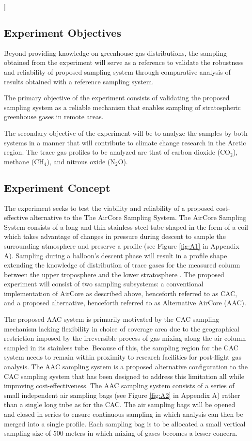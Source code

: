 ]\documentclass[a4paper,12pt,twoside]{article}
\begin{document}
\subsection{Experiment Objectives}

Beyond providing knowledge on greenhouse gas distributions, the sampling obtained from the experiment will serve as a reference to validate the robustness and reliability of proposed sampling system through comparative analysis of results obtained with a reference sampling system.

The primary objective of the experiment consists of validating the proposed sampling system as a reliable mechanism that enables sampling of stratospheric greenhouse gases in remote areas.

The secondary objective of the experiment will be to analyze the samples by both systems in a manner that will contribute to climate change research in the Arctic region. The trace gas profiles to be analyzed are that of carbon dioxide (CO$_{2}$), methane (CH$_{4}$), and nitrous oxide (N$_{2}$O). 
\subsection{Experiment Concept}

The experiment seeks to test the viability and reliability of a proposed cost-effective alternative to the The AirCore Sampling System. The AirCore Sampling System consists of a long and thin stainless steel tube shaped in the form of a coil which takes advantage of changes in pressure during descent to sample the surrounding atmosphere and preserve a profile (see Figure \ref{fig:A1} in Appendix A). Sampling during a balloon’s descent phase will result in a profile shape extending the knowledge of distribution of trace gases for the measured column between the upper troposphere and the lower stratosphere \cite{Karion}. The proposed experiment will consist of two sampling subsystems: a conventional implementation of AirCore as described above, henceforth referred to as CAC, and a proposed alternative, henceforth referred to as Alternative AirCore (AAC).

The proposed AAC system is primarily motivated by the CAC sampling mechanism lacking flexibility in choice of coverage area due to the geographical restriction imposed by the irreversible process of gas mixing along the air column sampled in its stainless tube. Because of this, the sampling region for the CAC system needs to remain within proximity to research facilities for post-flight gas analysis. The AAC sampling system is a proposed alternative configuration to the CAC sampling system that has been designed to address this limitation all while improving cost-effectiveness. The AAC sampling system consists of a series of small independent air sampling bags (see Figure \ref{fig:A2} in Appendix A) rather than a single long tube as for the CAC. The air sampling bags will be opened and closed in series to ensure continuous sampling in which analysis can then be merged into a single profile. Each sampling bag is to be allocated a small vertical sampling size of 500 meters in which mixing of gases becomes a lesser concern.
\end{document}

